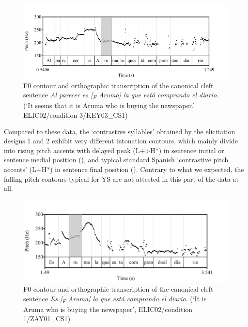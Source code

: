 \documentclass[output=paper]{langsci/langscibook}
\begin{document}
\begin{figure}
\includegraphics[width=\textwidth]{figures/UTH-img36.png}
\caption{F0 contour and orthographic transcription of the canonical cleft sentence
\textit{Al parecer es [\textsubscript{F} Aruma] la que está comprando el diario}. 
(`It seems that it is Aruma who is buying the newspaper.' ELIC02/condition 3/KEY03\_CS1)}
\label{fig:uth:13}
\end{figure}

Compared to these data, the ‘contrastive syllables' obtained by the elicitation designs 1 and 2 exhibit very different intonation contours, which mainly divide into rising pitch accents with delayed peak (L+>H*) in sentence initial or sentence medial position (), and typical standard Spanish ‘contrastive pitch accents' (L+H*) in sentence final position (). Contrary to what we expected, the falling pitch contours typical for YS are not attested in this part of the data at all.

\begin{figure}
\includegraphics[width=\textwidth]{figures/UTH-img37.png}
\caption{F0 contour and orthographic transcription of the canonical cleft sentence \textit{Es [\textsubscript{F}} \textit{Aruma] la que está comprando el diario}. (‘It is Aruma who is buying the newspaper', ELIC02/condition 1/ZAY01\_CS1)}
\label{fig:uth:14}
\end{figure} 
 
\end{document}
